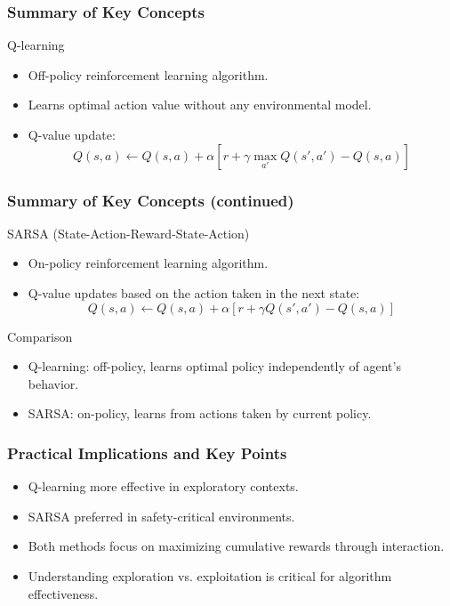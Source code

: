 \documentclass[aspectratio=169]{beamer}
\begin{document}
\begin{frame}[fragile]
    \frametitle{Summary of Key Concepts}
    \begin{block}{Q-learning}
        \begin{itemize}
            \item Off-policy reinforcement learning algorithm.
            \item Learns optimal action value without any environmental model.
            \item Q-value update: 
            \[
            Q(s, a) \gets Q(s, a) + \alpha \left[ r + \gamma \max_{a'} Q(s', a') - Q(s, a) \right]
            \]
        \end{itemize}
    \end{block}
\end{frame}

\begin{frame}[fragile]
    \frametitle{Summary of Key Concepts (continued)}
    \begin{block}{SARSA (State-Action-Reward-State-Action)}
        \begin{itemize}
            \item On-policy reinforcement learning algorithm.
            \item Q-value updates based on the action taken in the next state:
            \[
            Q(s, a) \gets Q(s, a) + \alpha \left[ r + \gamma Q(s', a') - Q(s, a) \right]
            \]
        \end{itemize}
    \end{block}

    \begin{block}{Comparison}
        \begin{itemize}
            \item Q-learning: off-policy, learns optimal policy independently of agent’s behavior.
            \item SARSA: on-policy, learns from actions taken by current policy.
        \end{itemize}
    \end{block}
\end{frame}

\begin{frame}[fragile]
    \frametitle{Practical Implications and Key Points}
    \begin{itemize}
        \item Q-learning more effective in exploratory contexts.
        \item SARSA preferred in safety-critical environments.
        \item Both methods focus on maximizing cumulative rewards through interaction.
        \item Understanding exploration vs. exploitation is critical for algorithm effectiveness.
    \end{itemize}
\end{frame}
\end{document}
